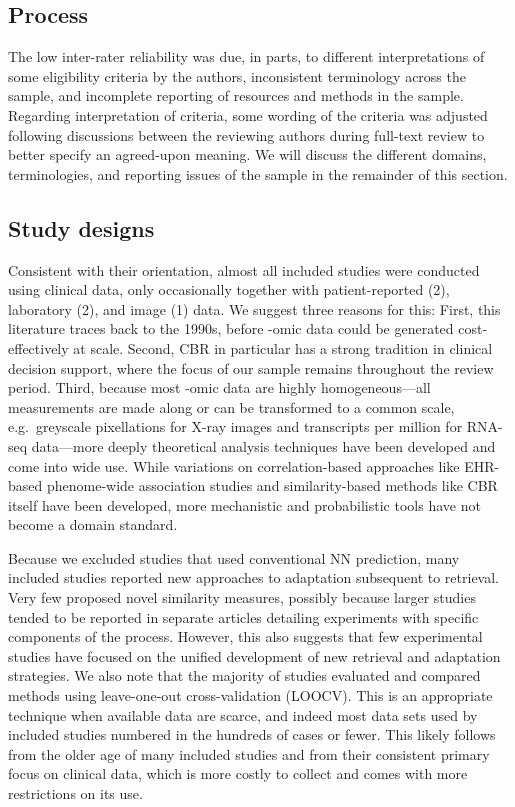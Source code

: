 \documentclass[preprint, 3p,
authoryear]{elsarticle} %
\begin{document}
\hypertarget{process}{%
\subsection{Process}\label{process}}

The low inter-rater reliability was due, in parts, to different
interpretations of some eligibility criteria by the authors,
inconsistent terminology across the sample, and incomplete reporting of
resources and methods in the sample. Regarding interpretation of
criteria, some wording of the criteria was adjusted following
discussions between the reviewing authors during full-text review to
better specify an agreed-upon meaning. We will discuss the different
domains, terminologies, and reporting issues of the sample in the
remainder of this section.

\hypertarget{study-designs}{%
\subsection{Study designs}\label{study-designs}}

Consistent with their orientation, almost all included studies were
conducted using clinical data, only occasionally together with
patient-reported (2), laboratory (2), and image (1) data. We suggest
three reasons for this: First, this literature traces back to the 1990s,
before -omic data could be generated cost-effectively at scale. Second,
CBR in particular has a strong tradition in clinical decision support,
where the focus of our sample remains throughout the review period.
Third, because most -omic data are highly homogeneous---all measurements
are made along or can be transformed to a common scale, e.g.~greyscale
pixellations for X-ray images and transcripts per million for RNA-seq
data---more deeply theoretical analysis techniques have been developed
and come into wide use. While variations on correlation-based approaches
like EHR-based phenome-wide association studies and similarity-based
methods like CBR itself have been developed, more mechanistic and
probabilistic tools have not become a domain standard.

Because we excluded studies that used conventional NN prediction, many
included studies reported new approaches to adaptation subsequent to
retrieval. Very few proposed novel similarity measures, possibly because
larger studies tended to be reported in separate articles detailing
experiments with specific components of the process. However, this also
suggests that few experimental studies have focused on the unified
development of new retrieval and adaptation strategies. We also note
that the majority of studies evaluated and compared methods using
leave-one-out cross-validation (LOOCV). This is an appropriate technique
when available data are scarce, and indeed most data sets used by
included studies numbered in the hundreds of cases or fewer. This likely
follows from the older age of many included studies and from their
consistent primary focus on clinical data, which is more costly to
collect and comes with more restrictions on its use.
\end{document}
